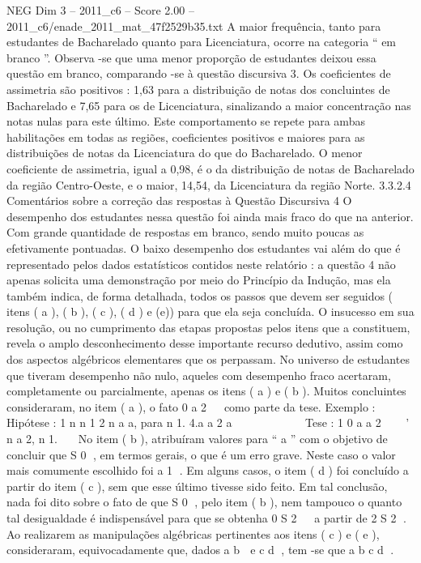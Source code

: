 \begin{textsample}{NEG Dim 3 – 2011\_c6 – Score 2.00 – 2011\_c6/enade\_2011\_mat\_47f2529b35.txt}
A maior frequência, tanto para estudantes de Bacharelado quanto para Licenciatura, ocorre na categoria “ em branco ”.
Observa -se que uma menor proporção de estudantes deixou essa questão em branco, comparando -se à questão discursiva 3.
Os coeficientes de assimetria são positivos : 1,63 para a distribuição de notas dos concluintes de Bacharelado e 7,65 para os de Licenciatura, sinalizando a maior concentração nas notas nulas para este último.
Este comportamento se repete para ambas habilitações em todas as regiões, coeficientes positivos e maiores para as distribuições de notas da Licenciatura do que do Bacharelado.
O menor coeficiente de assimetria, igual a 0,98, é o da distribuição de notas de Bacharelado da região Centro-Oeste, e o maior, 14,54, da Licenciatura da região Norte. 3.3.2.4 Comentários sobre a correção das respostas à Questão Discursiva 4 O desempenho dos estudantes nessa questão foi ainda mais fraco do que na anterior.
Com grande quantidade de respostas em branco, sendo muito poucas as efetivamente pontuadas.
O baixo desempenho dos estudantes vai além do que é representado pelos dados estatísticos contidos neste relatório : a questão 4 não apenas solicita uma demonstração por meio do Princípio da Indução, mas ela também indica, de forma detalhada, todos os passos que devem ser seguidos ( itens ( a ), ( b ), ( c ), ( d ) e (e)) para que ela seja concluída.
O insucesso em sua resolução, ou no cumprimento das etapas propostas pelos itens que a constituem, revela o amplo desconhecimento desse importante recurso dedutivo, assim como dos aspectos algébricos elementares que os perpassam.
No universo de estudantes que tiveram desempenho não nulo, aqueles com desempenho fraco acertaram, completamente ou parcialmente, apenas os itens ( a ) e ( b ).
Muitos concluintes consideraram, no item ( a ), o fato 0 a 2   como parte da tese.
Exemplo : Hipótese : 1 n n 1 2 n a a, para n 1. 4.a a 2 a           Tese : 1 0 a a 2    ' n a 2, n 1.   No item ( b ), atribuíram valores para “ a ” com o objetivo de concluir que S 0 , em termos gerais, o que é um erro grave.
Neste caso o valor mais comumente escolhido foi a 1 .
Em alguns casos, o item ( d ) foi concluído a partir do item ( c ), sem que esse último tivesse sido feito.
Em tal conclusão, nada foi dito sobre o fato de que S 0 , pelo item ( b ), nem tampouco o quanto tal desigualdade é indispensável para que se obtenha 0 S 2   a partir de 2 S 2 .
Ao realizarem as manipulações algébricas pertinentes aos itens ( c ) e ( e ), consideraram, equivocadamente que, dados a b  e c d , tem -se que a b c d .

\end{textsample}

